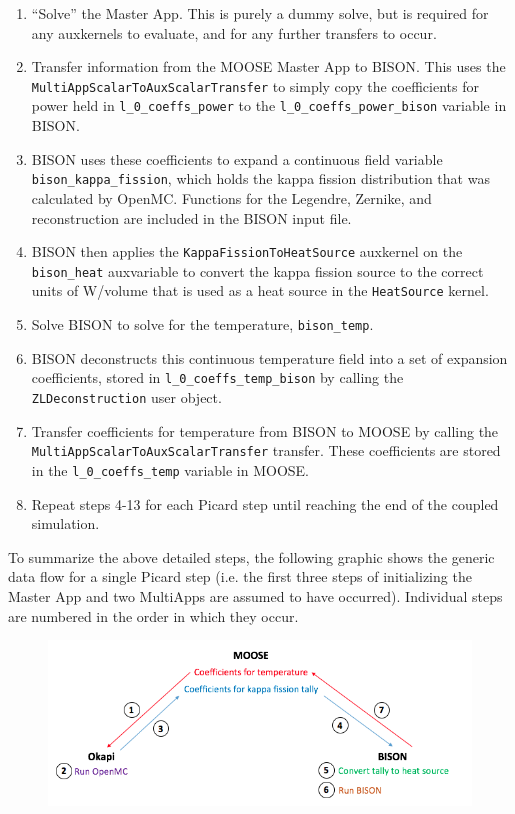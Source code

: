 \documentclass[10pt]{article}
\numberwithin{equation}{section} %
\begin{document}
\begin{enumerate}
\item ``Solve'' the Master App. This is purely a dummy solve, but is required for any auxkernels to evaluate, and for any further transfers to occur.
\item Transfer information from the MOOSE Master App to BISON. This uses the {\tt MultiAppScalarToAuxScalarTransfer} to simply copy the coefficients for power held in {\tt l\_0\_coeffs\_power} to the {\tt l\_0\_coeffs\_power\_bison} variable in BISON.
\item BISON uses these coefficients to expand a continuous field variable {\tt bison\_kappa\_fission}, which holds the kappa fission distribution that was calculated by OpenMC. Functions for the Legendre, Zernike, and reconstruction are included in the BISON input file.
\item BISON then applies the {\tt KappaFissionToHeatSource} auxkernel on the {\tt bison\_heat} auxvariable to convert the kappa fission source to the correct units of W/volume that is used as a heat source in the {\tt HeatSource} kernel.
\item Solve BISON to solve for the temperature, {\tt bison\_temp}.
\item BISON deconstructs this continuous temperature field into a set of expansion coefficients, stored in {\tt l\_0\_coeffs\_temp\_bison} by calling the {\tt ZLDeconstruction} user object.
\item Transfer coefficients for temperature from BISON to MOOSE by calling the {\tt MultiAppScalarToAuxScalarTransfer} transfer. These coefficients are stored in the {\tt l\_0\_coeffs\_temp} variable in MOOSE. 
\item Repeat steps 4-13 for each Picard step until reaching the end of the coupled simulation.
\end{enumerate}

To summarize the above detailed steps, the following graphic shows the generic data flow for a single Picard step (i.e. the first three steps of initializing the Master App and two MultiApps are assumed to have occurred). Individual steps are numbered in the order in which they occur.

\begin{figure}[H]
\centering
\includegraphics[width=15cm]{OpenMC-BISON-simple.png}
\end{figure}
\end{document}
